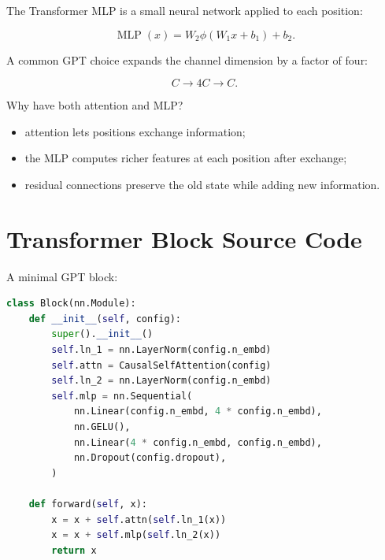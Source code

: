 The Transformer MLP is a small neural network applied to each position:

\[
\operatorname{MLP}(x)=W_2\phi(W_1x+b_1)+b_2.
\]

A common GPT choice expands the channel dimension by a factor of four:

\[
C\rightarrow 4C\rightarrow C.
\]

\begin{center}
\end{center}

Why have both attention and MLP?

\begin{itemize}
  \item attention lets positions exchange information;
  \item the MLP computes richer features at each position after exchange;
  \item residual connections preserve the old state while adding new information.
\end{itemize}

\section{Transformer Block Source Code}

A minimal GPT block:

\begin{lstlisting}[language=Python]
class Block(nn.Module):
    def __init__(self, config):
        super().__init__()
        self.ln_1 = nn.LayerNorm(config.n_embd)
        self.attn = CausalSelfAttention(config)
        self.ln_2 = nn.LayerNorm(config.n_embd)
        self.mlp = nn.Sequential(
            nn.Linear(config.n_embd, 4 * config.n_embd),
            nn.GELU(),
            nn.Linear(4 * config.n_embd, config.n_embd),
            nn.Dropout(config.dropout),
        )

    def forward(self, x):
        x = x + self.attn(self.ln_1(x))
        x = x + self.mlp(self.ln_2(x))
        return x
\end{lstlisting}


